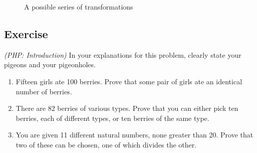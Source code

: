 \documentclass{article}
\newcounter{counter}
\newcommand{\Exercise}{Exercise \stepcounter{counter}\thecounter}
\begin{document}
\begin{enumerate}
\begin{enumerate}[label = \roman*.]
\begin{figure}[htbp]
            \vspace{3mm}
            \caption{A possible series of transformations}
            \label{E2cii}
            \end{figure}
            
        \end{enumerate}
        
    \end{enumerate}

\subsection*{\Exercise}
    \textit{(PHP: Introduction)} In your explanations for this problem, clearly state your pigeons and your pigeonholes.
    \begin{enumerate}
        \item Fifteen girls ate 100 berries. Prove that some pair of girls ate an identical number of berries.
        \item There are 82 berries of various types. Prove that you can either pick ten berries, each of different types, or ten berries of the same type.
        \item You are given 11 different natural numbers, none greater than 20. Prove that two of these can be chosen, one of which divides the other.
    \end{enumerate}
\end{document}
